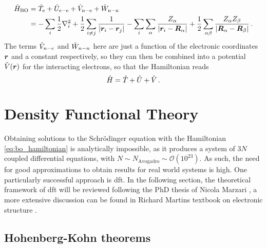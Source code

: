 \documentclass[main.tex]{subfiles}
\begin{document}
\begin{align}
    \hat{H}_{\mathrm{BO}} &= \hat{T}_{\mathrm{e}} + \hat{U}_{\mathrm{e-e}} + \hat{V}_{\mathrm{n-e}} + \hat{W}_{\mathrm{n-n}} \\
    &= -\sum_i \frac{1}{2} \nabla^2_i 
    + \frac{1}{2} \sum_{i \neq j} \frac{1}{\vert \vb*{r}_i - \vb*{r}_j \vert} 
    - \sum_i \sum_{\alpha} \frac{Z_{\alpha}}{\vert \vb*{r}_i 
    - \vb*{R}_{\alpha} \vert} 
    + \frac{1}{2} \sum_{\alpha \beta} \frac{Z_{\alpha} Z_{\beta}}{\vert \vb*{R}_{\alpha} - \vb*{R}_{\beta} \vert}\,. \label{eq:bo_hamiltonian}
\end{align}
The terms \(\hat{V}_{n-e}\) and \(\hat{W}_{n-n}\) here are just a function of the electronic coordinates \(\vb*{r}\) and a constant respectively, so they can then be combined into a potential \(\hat{V} (\vb*{r})\) for the interacting electrons, so that the Hamiltonian reads
\begin{equation}\label{eq:solid_state_hamiltonian}
    \hat{H} = \hat{T} + \hat{U} + \hat{V}\,.
\end{equation}

\section{Density Functional Theory\label{sec:theory_dft}}

Obtaining solutions to the Schrödinger equation with the Hamiltonian \ref{eq:bo_hamiltonian} is analytically impossible, as it produces a system of \(3N\) coupled differential equations, with \(N \sim N_{\mathrm{Avogadro}} \sim \mathcal{O} (10^{23})\).
As such, the need for good approximations to obtain results for real world
systems is high.
One particularly successful approach is \acrfull{dft}.
In the following section, the theoretical framework of \acrshort{dft} will be reviewed following the PhD thesis of Nicola Marzari \cite{marzari_ab-initio_1996}, a more extensive discussion can be found in Richard Martins textbook on electronic structure \cite{martin_electronic_2004}.

\subsection{Hohenberg-Kohn theorems}
\end{document}
